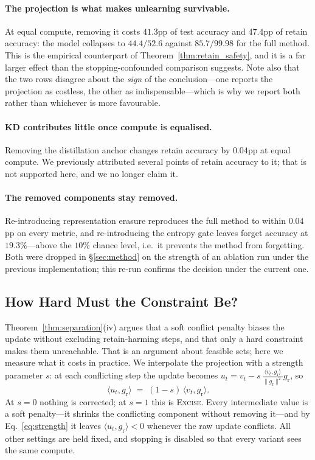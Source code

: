 \documentclass{article}
\newcommand{\ours}{\textsc{Excise}}
\newcommand{\gr}{g_{\mathrm{r}}}
\theoremstyle{remark}
\theoremstyle{plain}
\begin{document}
\paragraph{The projection is what makes unlearning survivable.}
At equal compute, removing it costs $41.3$pp of test accuracy and
$47.4$pp of retain accuracy: the model collapses to $44.4/52.6$ against
$85.7/99.98$ for the full method. This is the empirical counterpart of
Theorem~\ref{thm:retain_safety}, and it is a far larger effect than the
stopping-confounded comparison suggests. Note also that the two rows disagree
about the \emph{sign} of the conclusion---one reports the projection as
costless, the other as indispensable---which is why we report both rather than
whichever is more favourable.

\paragraph{KD contributes little once compute is equalised.}
Removing the distillation anchor changes retain accuracy by $0.04$pp at equal
compute. We previously attributed several points of retain accuracy to it; that
is not supported here, and we no longer claim it.

\paragraph{The removed components stay removed.}
Re-introducing representation erasure reproduces the full method to within
$0.04$pp on every metric, and re-introducing the entropy gate leaves forget
accuracy at $19.3\%$---above the $10\%$ chance level, i.e.\ it prevents the
method from forgetting. Both were dropped in \S\ref{sec:method} on the strength
of an ablation run under the previous implementation; this re-run confirms the
decision under the current one.

\subsection{How Hard Must the Constraint Be?}\label{sec:strength}

Theorem~\ref{thm:separation}(iv) argues that a soft conflict penalty biases the
update without excluding retain-harming steps, and that only a hard constraint
makes them unreachable. That is an argument about feasible sets; here we measure
what it costs in practice. We interpolate the projection with a strength
parameter $s$: at each conflicting step the update becomes
$u_t = v_t - s\,\frac{\langle v_t,\gr\rangle}{\|\gr\|^2}\gr$, so
\begin{equation}\label{eq:strength}
\langle u_t, \gr\rangle \;=\; (1-s)\,\langle v_t, \gr\rangle .
\end{equation}
At $s=0$ nothing is corrected; at $s=1$ this is \ours{}. Every intermediate
value is a soft penalty---it shrinks the conflicting component without removing
it---and by Eq.~\ref{eq:strength} it leaves $\langle u_t,\gr\rangle<0$ whenever
the raw update conflicts. All other settings are held fixed, and stopping is
disabled so that every variant sees the same compute.
\end{document}
